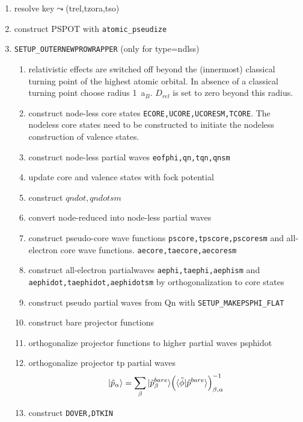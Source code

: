 \documentclass[11pt,a4paper]{report}
\begin{document}
\begin{enumerate}
\item resolve key$\leadsto$(trel,tzora,tso)
%
\item construct PSPOT with \verb|atomic_pseudize|
%
\item \verb|SETUP_OUTERNEWPROWRAPPER| (only for type=ndlss)
\begin{enumerate}
\item relativistic effects are switched off beyond the (innermost)
  classical turning point of the highest atomic orbital. In absence of
  a classical turning point choose radius 1~a$_B$. $D_{rel}$ is set to
  zero beyond this radius.
%
\item construct node-less core states
  \verb|ECORE,UCORE,UCORESM,TCORE|. The nodeless core states need to
  be constructed to initiate the nodeless construction of valence
  states.
%
\item construct node-less partial waves \verb|eofphi,qn,tqn,qnsm|
%
\item update core and valence states with fock potential
%
\item construct $qndot,qndotsm$
%
\item convert node-reduced into node-less partial waves
%
\item construct pseudo-core wave functions \verb|pscore,tpscore,pscoresm| and
  all-electron core wave functions. \verb|aecore,taecore,aecoresm|
%
\item construct all-electron partialwaves \verb|aephi,taephi,aephism|
  and \verb|aephidot,taephidot,aephidotsm| by orthogonalization to core states
%
\item construct pseudo partial waves from Qn with \verb|SETUP_MAKEPSPHI_FLAT|
%
\item construct bare projector functions
\item orthogonalize projector functions to higher partial waves psphidot
\item orthogonalize projector tp partial waves
\begin{eqnarray}
|\tilde{p}_\alpha\rangle=\sum_{\beta}|\tilde{p}^{bare}_{\beta}\rangle 
\Bigl(\langle\tilde{\phi}|\tilde{p}^{bare}\rangle\Bigr)^{-1}_{\beta,\alpha}
\end{eqnarray}
%
\item construct \verb|DOVER,DTKIN|

\end{enumerate}
%
\end{enumerate}

\end{document}
